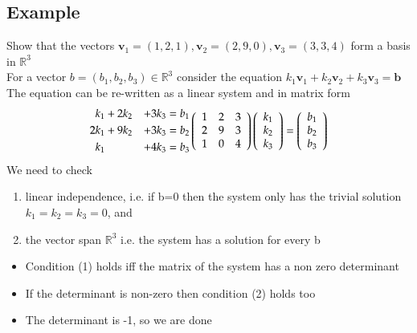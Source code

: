 \documentclass{article}[18pt]
\begin{document}
\subsection{Example}
Show that the vectors $\mathbf { v } _ { 1 } = ( 1,2,1 ) , \mathbf { v } _ { 2 } = ( 2,9,0 ) , \mathbf { v } _ { 3 } = ( 3,3,4 )$ form a basis in $\mathbb{R}^3$\\
For a vector $b=(b_1,b_2,b_3)\in \mathbb{R}^3$ consider the equation $k _ { 1 } \mathbf { v } _ { 1 } + k _ { 2 } \mathbf { v } _ { 2 } + k _ { 3 } \mathbf { v } _ { 3 } = \mathbf { b }$\\
The equation can be re-written as a linear system and in matrix form
$$\begin{aligned} 
k _ { 1 }& + 2 k _ { 2 } & + 3 k _ { 3 } &= b _ { 1 } \\ 
2 k _ { 1 } &+ 9 k _ { 2 } & + 3 k _ { 3 }& = b _ { 2 } \\ 
k _ { 1 }& & + 4 k _ { 3 } & = b _ { 3 } \end{aligned} \left( \begin{array} { c c c } { 1 } & { 2 } & { 3 } \\ { 2 } & { 9 } & { 3 } \\ { 1 } & { 0 } & { 4 } \end{array} \right) \left( \begin{array} { l } { k _ { 1 } } \\ { k _ { 2 } } \\ { k _ { 3 } } \end{array} \right) = \left( \begin{array} { c } { b _ { 1 } } \\ { b _ { 2 } } \\ { b _ { 3 } } \end{array} \right)$$
We need to check
\begin{enumerate}
	\item linear independence, i.e. if b=0 then the system only has the trivial solution $k_1=k_2=k_3=0$, and
	\item the vector span $\mathbb{R}^3$ i.e. the system has a solution for every b
\end{enumerate}
\begin{itemize}
	\item Condition (1) holds iff the matrix of the system has a non zero determinant
	\item If the determinant is non-zero then condition (2) holds too
	\item The determinant is -1, so we are done
\end{itemize}
\end{document}
